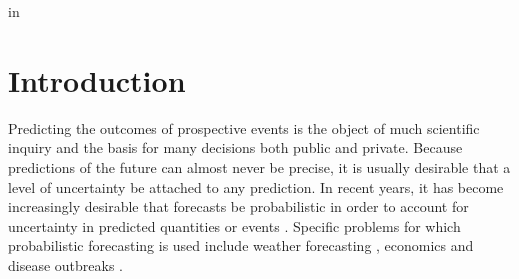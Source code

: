 \documentclass[11pt,notitlepage]{isuthesis}
\begin{document}

\def\@makechapterheada{\vspace*{-2cm}\titlepage} %


\raggedright
{} in %


{
\tableofcontents
}
 \cleardoublepage {}
\pagebreak
{}
\listoftables
\cleardoublepage {} {}
\listoffigures

\cleardoublepage {}



\cleardoublepage {}

\cleardoublepage {}

\newpage
{}












\section{Introduction}
Predicting the outcomes of prospective events is the object of much scientific
inquiry and the basis for many decisions both public and private. Because 
predictions of the future can almost never be precise, it is usually desirable
that a level of uncertainty be attached to any prediction. In recent years, it
has become increasingly desirable that forecasts be probabilistic in order to 
account for uncertainty in predicted quantities or events 
\cite{gneiting2014probabilistic}. Specific problems for 
which probabilistic forecasting is used include weather forecasting
\cite{baran2018combining}, economics \cite{groen2013real} and disease outbreaks
\cite{yamana2016superensemble}.
\end{document}
